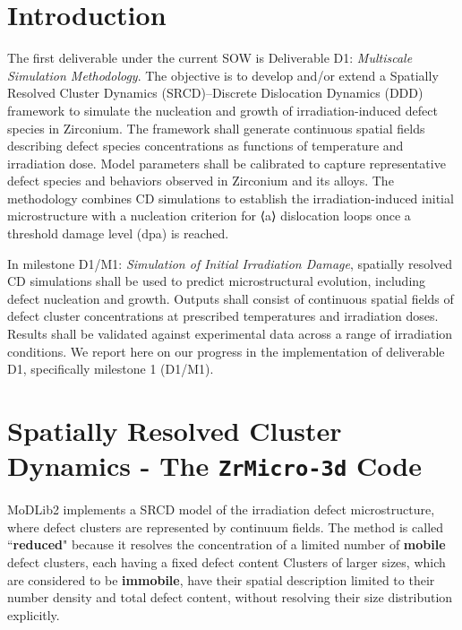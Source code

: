 \documentclass{article}
\begin{document}
\section{Introduction}
The first deliverable under the current SOW is Deliverable D1: \emph{Multiscale Simulation Methodology}. The objective is to develop and/or extend a Spatially Resolved Cluster Dynamics (SRCD)–Discrete Dislocation
Dynamics (DDD) framework to simulate the nucleation and growth of irradiation-induced
defect species in Zirconium. The framework shall generate continuous spatial fields describing defect
species concentrations as functions of temperature and irradiation dose. Model parameters shall be
calibrated to capture representative defect species and behaviors observed in Zirconium and its
alloys.
The methodology combines CD simulations to establish the irradiation-induced initial microstructure
with a nucleation criterion for ⟨a⟩ dislocation loops once a threshold damage level (dpa) is reached.

In milestone D1/M1: \emph{Simulation of Initial Irradiation Damage}, spatially resolved CD simulations
shall be used to predict microstructural evolution, including defect nucleation and growth.
Outputs shall consist of continuous spatial fields of defect cluster concentrations at prescribed
temperatures and irradiation doses. Results shall be validated against experimental data across a
range of irradiation conditions.
We report here on our progress in the implementation of deliverable D1, specifically milestone 1 (D1/M1).


\section{Spatially Resolved Cluster Dynamics - The \texttt{ZrMicro-3d} Code}
\label{sec:SRCD}

MoDLib2 implements a SRCD model of  the irradiation defect microstructure, where defect clusters are represented by continuum fields. The method is called ``\textbf{reduced}" because it resolves the concentration of a limited number of \textbf{mobile} defect clusters, each having a fixed defect content Clusters of larger sizes, which are considered to be \textbf{immobile}, have their spatial description limited to their number density and total defect content, without resolving their size distribution explicitly.
\end{document}
